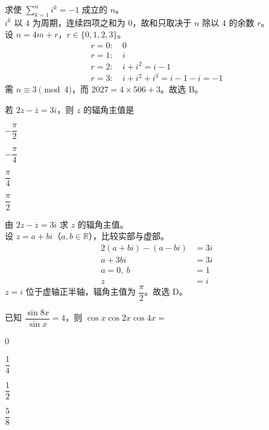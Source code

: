 \begin{solution}
    求使 $\displaystyle\sum_{k=1}^{n} i^{k}=-1$ 成立的 $n$。\\
    $i^k$ 以 $4$ 为周期，连续四项之和为 $0$，故和只取决于 $n$ 除以 $4$ 的余数 $r$。\\
    设 $n=4m+r$，$r\in\{0,1,2,3\}$。\\
    \begin{align*}
        r=0:&\ 0 \\
        r=1:&\ i \\
        r=2:&\ i+i^2=i-1 \\
        r=3:&\ i+i^2+i^3=i-1-i=-1
    \end{align*}
    需 $n\equiv3\pmod 4$，而 $2027=4\times506+3$。故选 B。
\end{solution}

\begin{question}
    若 $2z-\overline{z}=3i$，则 $z$ 的辐角主值是 \paren[D]
    \begin{choices}
        \item $-\dfrac{\pi}{2}$
        \item $-\dfrac{\pi}{4}$
        \item $\dfrac{\pi}{4}$
        \item $\dfrac{\pi}{2}$
    \end{choices}
\end{question}

\begin{solution}
    由 $2z-\overline{z}=3i$ 求 $z$ 的辐角主值。\\
    设 $z=a+bi$（$a,b\in\mathbb{R}$），比较实部与虚部。\\
    \begin{align*}
        2(a+bi)-(a-bi) &=3i \\
        a+3bi &=3i \\
        a=0,\ b &=1 \\
        z &=i
    \end{align*}
    $z=i$ 位于虚轴正半轴，辐角主值为 $\dfrac{\pi}{2}$。故选 D。
\end{solution}

\begin{question}
    已知 $\dfrac{\sin 8x}{\sin x}=4$，则 $\cos x\cos 2x\cos 4x=$ \paren[C]
    \begin{choices}
        \item $0$
        \item $\dfrac{1}{4}$
        \item $\dfrac{1}{2}$
        \item $\dfrac{5}{8}$
    \end{choices}
\end{question}

